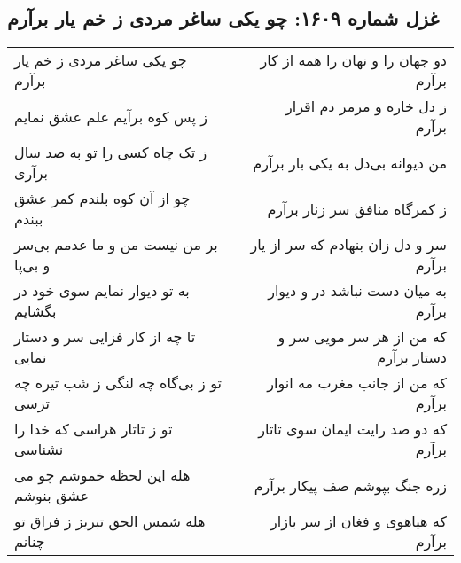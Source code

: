 \begin{center}
\section*{غزل شماره ۱۶۰۹: چو یکی ساغر مردی ز خم یار برآرم}
\label{sec:1609}
\begin{longtable}{l p{0.5cm} r}
چو یکی ساغر مردی ز خم یار برآرم
&&
دو جهان را و نهان را همه از کار برآرم
\\
ز پس کوه برآیم علم عشق نمایم
&&
ز دل خاره و مرمر دم اقرار برآرم
\\
ز تک چاه کسی را تو به صد سال برآری
&&
من دیوانه بی‌دل به یکی بار برآرم
\\
چو از آن کوه بلندم کمر عشق ببندم
&&
ز کمرگاه منافق سر زنار برآرم
\\
بر من نیست من و ما عدمم بی‌سر و بی‌پا
&&
سر و دل زان بنهادم که سر از یار برآرم
\\
به تو دیوار نمایم سوی خود در بگشایم
&&
به میان دست نباشد در و دیوار برآرم
\\
تا چه از کار فزایی سر و دستار نمایی
&&
که من از هر سر مویی سر و دستار برآرم
\\
تو ز بی‌گاه چه لنگی ز شب تیره چه ترسی
&&
که من از جانب مغرب مه انوار برآرم
\\
تو ز تاتار هراسی که خدا را نشناسی
&&
که دو صد رایت ایمان سوی تاتار برآرم
\\
هله این لحظه خموشم چو می عشق بنوشم
&&
زره جنگ بپوشم صف پیکار برآرم
\\
هله شمس الحق تبریز ز فراق تو چنانم
&&
که هیاهوی و فغان از سر بازار برآرم
\\
\end{longtable}
\end{center}
